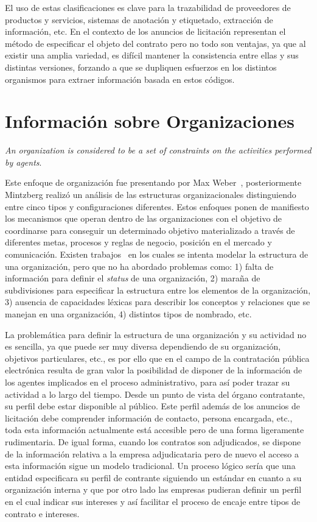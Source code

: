 El uso de estas clasificaciones es clave para la trazabilidad de proveedores de productos y servicios,
sistemas de anotación y etiquetado, extracción de información, etc. En el contexto de los anuncios
de licitación representan el método de especificar el objeto del contrato pero no todo
son ventajas, ya que al existir una amplia variedad, es difícil mantener la consistencia entre ellas
y sus distintas versiones, forzando a que se dupliquen esfuerzos en los distintos organismos para 
extraer información basada en estos códigos. 

\section{Información sobre Organizaciones}
\textit{An organization is considered to be a set of constraints on the activities performed by agents}. 

Este enfoque de organización fue presentando por Max Weber~\cite{Weber1978}, posteriormente Mintzberg realizó un análisis
de las estructuras organizacionales distinguiendo entre cinco tipos y configuraciones diferentes. Estos enfoques
ponen de manifiesto los mecanismos que operan dentro de las organizaciones con el objetivo
de coordinarse para conseguir un determinado objetivo materializado a través de diferentes metas,
procesos y reglas de negocio, posición en el mercado y comunicación. Existen trabajos~\cite{Fox95anorganisation}
en los cuales se intenta modelar la estructura de una organización, pero que no ha abordado problemas como:
1) falta de información para definir el \textit{status} de una organización, 2) maraña de subdivisiones
para especificar la estructura entre los elementos de la organización, 3) ausencia de capacidades léxicas
para describir los conceptos y relaciones que se manejan en una organización, 4) distintos tipos
de nombrado, etc. 

La problemática para definir la estructura de una organización y su actividad no es sencilla, ya que puede
ser muy diversa dependiendo de su organización, objetivos particulares, etc., es por ello que en el campo
de la contratación pública electrónica resulta de gran valor la posibilidad de disponer de la información
de los agentes implicados en el proceso administrativo, para así poder trazar su actividad a lo largo
del tiempo. Desde un punto de vista del órgano contratante, su perfil debe estar disponible al público. Este
perfil además de los anuncios de licitación debe comprender información de contacto, persona encargada, etc., 
toda esta información actualmente está accesible pero de una forma ligeramente rudimentaria. De igual forma, cuando
los contratos son adjudicados, se dispone de la información relativa a la empresa adjudicataria pero de nuevo
el acceso a esta información sigue un modelo tradicional. Un proceso lógico sería que una entidad especificara
su perfil de contrante siguiendo un estándar en cuanto a su organización interna y que por otro lado
las empresas pudieran definir un perfil en el cual indicar sus intereses y así facilitar el proceso de 
encaje entre tipos de contrato e intereses. 

